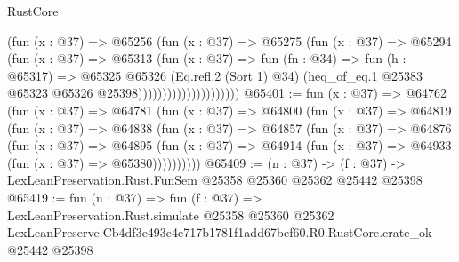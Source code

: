 \begin{lexlean}{RustCore}
\begin{coremodule}
                                  (fun (x : @37) =>
                                  @65256
                                    (fun (x : @37) =>
                                    @65275
                                      (fun (x : @37) =>
                                      @65294
                                        (fun (x : @37) =>
                                        @65313
                                          (fun (x : @37) =>
                                          fun (fn : @34) =>
                                          fun (h : @65317) =>
                                          @65325
                                            @65326
                                            (Eq.refl.{2} (Sort 1) @34)
                                            (heq_of_eq.{1}
                                              @25383
                                              @65323
                                              @65326
                                              @25398)))))))))))))))))))))
@65401 := fun (x : @37) =>
  @64762
    (fun (x : @37) =>
    @64781
      (fun (x : @37) =>
      @64800
        (fun (x : @37) =>
        @64819
          (fun (x : @37) =>
          @64838
            (fun (x : @37) =>
            @64857
              (fun (x : @37) =>
              @64876
                (fun (x : @37) =>
                @64895
                  (fun (x : @37) =>
                  @64914 (fun (x : @37) => @64933 (fun (x : @37) => @65380))))))))))
@65409 := (n : @37) ->
  (f : @37) -> LexLeanPreservation.Rust.FunSem @25358 @25360 @25362 @25442 @25398
@65419 := fun (n : @37) =>
  fun (f : @37) =>
  LexLeanPreservation.Rust.simulate
    @25358
    @25360
    @25362
    LexLeanPreserve.Cb4df3e493e4e717b1781f1add67bef60.R0.RustCore.crate_ok
    @25442
    @25398
\end{coremodule}
\end{lexlean}
